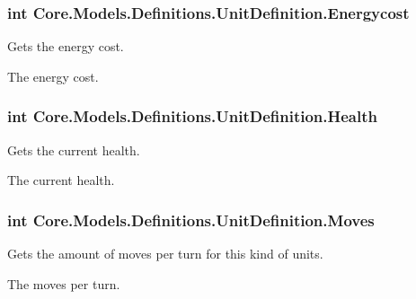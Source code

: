 \subsubsection[{Energycost}]{\setlength{\rightskip}{0pt plus 5cm}int Core.\+Models.\+Definitions.\+Unit\+Definition.\+Energycost\hspace{0.3cm}{\ttfamily [get]}}\label{classCore_1_1Models_1_1Definitions_1_1UnitDefinition_a0b9702e7e97e0038bc52cff2276a1846}


Gets the energy cost. 

The energy cost.\hypertarget{classCore_1_1Models_1_1Definitions_1_1UnitDefinition_ae0a91bec79fd1a79137e5c27668bd089}{}
\subsubsection[{Health}]{\setlength{\rightskip}{0pt plus 5cm}int Core.\+Models.\+Definitions.\+Unit\+Definition.\+Health\hspace{0.3cm}{\ttfamily [get]}}\label{classCore_1_1Models_1_1Definitions_1_1UnitDefinition_ae0a91bec79fd1a79137e5c27668bd089}


Gets the current health. 

The current health.\hypertarget{classCore_1_1Models_1_1Definitions_1_1UnitDefinition_a0fe401df39765664e20eb9b1d3df4c06}{}
\subsubsection[{Moves}]{\setlength{\rightskip}{0pt plus 5cm}int Core.\+Models.\+Definitions.\+Unit\+Definition.\+Moves\hspace{0.3cm}{\ttfamily [get]}}\label{classCore_1_1Models_1_1Definitions_1_1UnitDefinition_a0fe401df39765664e20eb9b1d3df4c06}


Gets the amount of moves per turn for this kind of units. 

The moves per turn.\hypertarget{classCore_1_1Models_1_1Definitions_1_1UnitDefinition_acf9bdfe102042bfc92207d6e08fcf995}{}
